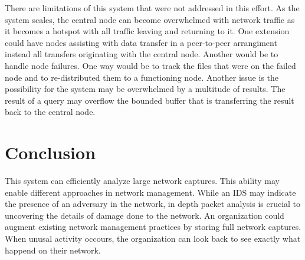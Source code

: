 \documentclass{article}
\begin{document}
\begin{multicols}{2}
There are limitations of this system that were not addressed in this effort.  As the system scales, the central node can become overwhelmed with network traffic as it becomes a hotspot with all traffic leaving and returning to it. One extension could have nodes assisting with data transfer in a peer-to-peer arrangiment instead all transfers originating with the central node.  Another would be to handle node failures. One way would be to track the files that were on the failed node and to re-distributed them to a functioning node.  Another issue is the possibility for the system may be overwhelmed by a multitude of results. The result of a query may overflow the bounded buffer that is transferring the result back to the central node.   


\section*{Conclusion}

This system can efficiently analyze large network captures. This ability may enable different approaches in network management.  While an IDS may indicate the presence of an adversary in the network, in depth packet analysis is crucial to uncovering the details of damage done to the network.  An organization could augment existing network management practices by storing full network captures.  When unusal activity occours, the organization can look back to see exactly what happend on their network.  

\end{multicols}
\end{document}
